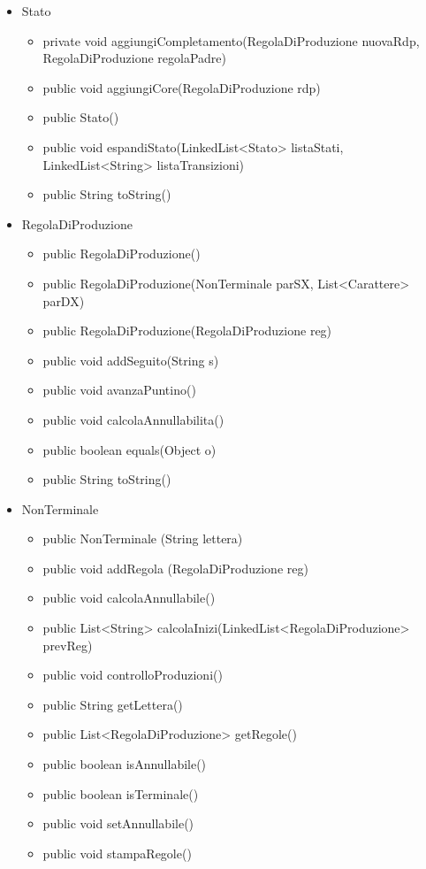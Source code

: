 \documentclass[12pt]{article}
\begin{document}
\begin{itemize}
\item Stato
\begin{itemize}
\item private void aggiungiCompletamento(RegolaDiProduzione nuovaRdp, RegolaDiProduzione regolaPadre)
\item public void aggiungiCore(RegolaDiProduzione rdp)
\item public Stato()
\item public void espandiStato(LinkedList<Stato> listaStati, LinkedList<String> listaTransizioni)
\item public String toString()
\end{itemize}
\item RegolaDiProduzione
\begin{itemize}
\item public RegolaDiProduzione()
\item public RegolaDiProduzione(NonTerminale parSX, List<Carattere> parDX)
\item public RegolaDiProduzione(RegolaDiProduzione reg)
\item public void addSeguito(String s)
\item public void avanzaPuntino()
\item public void calcolaAnnullabilita()
\item public boolean equals(Object o)
\item public String toString()
\end{itemize}
\item NonTerminale
\begin{itemize}
\item public NonTerminale (String lettera)
\item public void addRegola (RegolaDiProduzione reg)
\item public void calcolaAnnullabile()
\item public List<String> calcolaInizi(LinkedList<RegolaDiProduzione> prevReg)
\item public void controlloProduzioni()
\item public String getLettera()
\item public List<RegolaDiProduzione> getRegole()
\item public boolean isAnnullabile()
\item public boolean isTerminale()
\item public void setAnnullabile()
\item public void stampaRegole()

\end{itemize}
\end{itemize}
\end{document}
